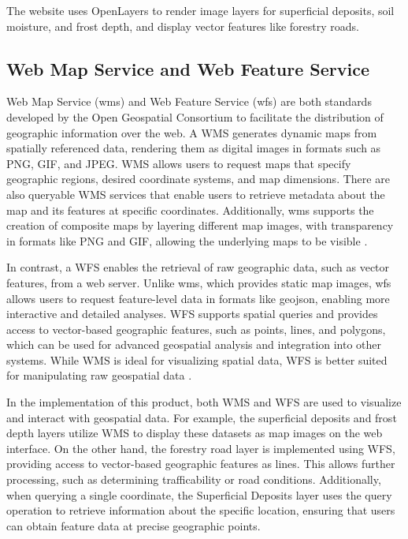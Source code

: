 The website uses OpenLayers to render image layers for \gls{superficial deposit}s, soil moisture, and \gls{frost} depth, and display vector features like forestry roads.  

\subsection{Web Map Service and Web Feature Service}
Web Map Service (\Gls{wms}) and Web Feature Service (\Gls{wfs}) are both standards developed by the Open Geospatial Consortium to facilitate the distribution of geographic information over the web. A WMS generates dynamic maps from spatially referenced data, rendering them as digital images in formats such as PNG, GIF, and JPEG. WMS allows users to request maps that specify geographic regions, desired coordinate systems, and map dimensions. There are also queryable WMS services that enable users to retrieve metadata about the map and its features at specific coordinates. Additionally, \Gls{wms} supports the creation of composite maps by layering different map images, with transparency in formats like PNG and GIF, allowing the underlying maps to be visible \cite{ogc2006wms}.

In contrast, a WFS enables the retrieval of raw geographic data, such as vector features, from a web server. Unlike \Gls{wms}, which provides static map images, \Gls{wfs} allows users to request feature-level data in formats like \Gls{geojson}, enabling more interactive and detailed analyses. WFS supports spatial queries and provides access to vector-based geographic features, such as points, lines, and polygons, which can be used for advanced geospatial analysis and integration into other systems. While WMS is ideal for visualizing spatial data, WFS is better suited for manipulating raw geospatial data \cite{ogc2005wfs}.

In the implementation of this product, both WMS and WFS are used to visualize and interact with geospatial data. For example, the superficial deposits and frost depth layers utilize WMS to display these datasets as map images on the web interface. On the other hand, the forestry road layer is implemented using WFS, providing access to vector-based geographic features as lines. This allows further processing, such as determining \gls{trafficability} or road conditions. Additionally, when querying a single coordinate, the Superficial Deposits layer uses the query operation to retrieve information about the specific location, ensuring that users can obtain feature data at precise geographic points.